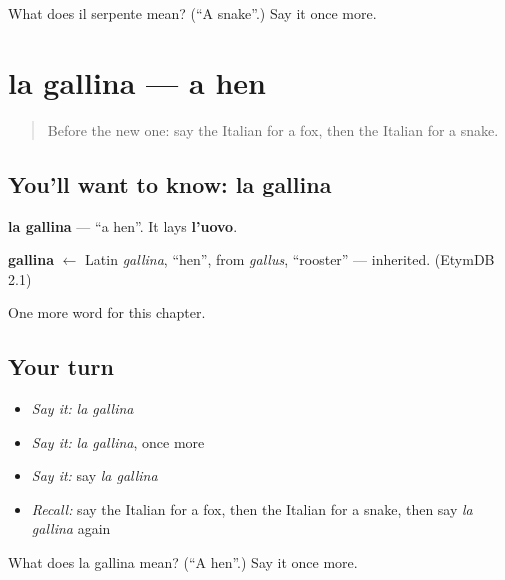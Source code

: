 \begin{tcolorbox}[breakable,colback=teal!4,colframe=teal!35!black,title={Before you move on}]
What does il serpente mean? (\textquotedblleft{}A snake\textquotedblright{}.) Say it once more.
\end{tcolorbox}
\section[la gallina]{la gallina — a hen}

\label{lesson:IT-C70-gallina}



\begin{quote}
Before the new one: say the Italian for a fox, then the Italian for a snake.
\end{quote}

\subsection*{You'll want to know: la gallina}
\textbf{la gallina} — \textquotedblleft{}a hen\textquotedblright{}. It lays \textbf{l'uovo}.

\begin{cousinweb}
\textbf{gallina} $\leftarrow$ Latin \emph{gallina}, \textquotedblleft{}hen\textquotedblright{}, from \emph{gallus}, \textquotedblleft{}rooster\textquotedblright{} — inherited. (EtymDB 2.1)
\end{cousinweb}

\begin{grammarlens}[title={What you've built}]
One more word for this chapter.
\end{grammarlens}

\subsection*{Your turn}
\begin{itemize}
\raggedright
  \item \emph{Say it:} \emph{la gallina}
  \item \emph{Say it:} \emph{la gallina}, once more
  \item \emph{Say it:} say \emph{la gallina}
  \item \emph{Recall:} say the Italian for a fox, then the Italian for a snake, then say \emph{la gallina} again
\end{itemize}

\begin{tcolorbox}[breakable,colback=teal!4,colframe=teal!35!black,title={Before you move on}]
What does la gallina mean? (\textquotedblleft{}A hen\textquotedblright{}.) Say it once more.
\end{tcolorbox}
